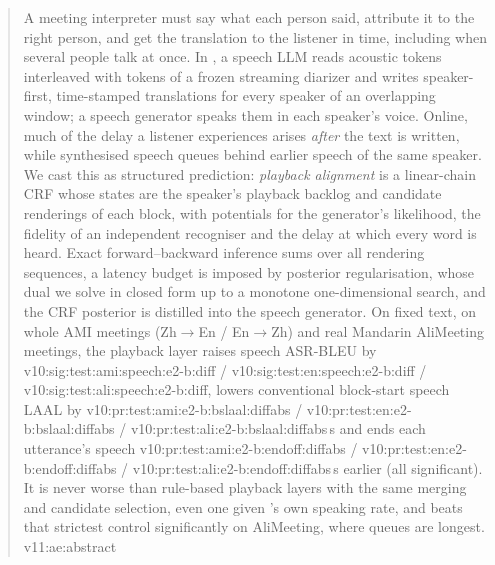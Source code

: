 \begin{abstract}
A meeting interpreter must say what each person said, attribute it to the right person, and get the translation to the
listener in time, including when several people talk at once. In \sys{}, a speech LLM reads acoustic tokens interleaved
with tokens of a frozen streaming diarizer and writes speaker-first, time-stamped translations for every speaker of an
overlapping window; a speech generator speaks them in each speaker's voice. Online, much of the delay a listener
experiences arises \emph{after} the text is written, while synthesised speech queues behind earlier speech of the same
speaker. We cast this as structured prediction: \emph{playback alignment} is a linear-chain CRF whose states are the
speaker's playback backlog and candidate renderings of each block, with potentials for the generator's likelihood, the
fidelity of an independent recogniser and the delay at which every word is heard. Exact forward--backward inference
sums over all rendering sequences, a latency budget is imposed by posterior regularisation, whose dual we solve in
closed form up to a monotone one-dimensional search, and the CRF posterior is distilled into the speech generator. On
fixed text, on whole AMI meetings (Zh$\rightarrow$En / En$\rightarrow$Zh) and real Mandarin AliMeeting meetings, the
playback layer raises speech ASR-BLEU by \num{v10:sig:test:ami:speech:e2-b:diff} /
\num{v10:sig:test:en:speech:e2-b:diff} / \num{v10:sig:test:ali:speech:e2-b:diff}, lowers conventional block-start
speech LAAL by \num{v10:pr:test:ami:e2-b:bslaal:diffabs} / \num{v10:pr:test:en:e2-b:bslaal:diffabs} /
\num{v10:pr:test:ali:e2-b:bslaal:diffabs}\,s and ends each utterance's speech
\num{v10:pr:test:ami:e2-b:endoff:diffabs} / \num{v10:pr:test:en:e2-b:endoff:diffabs} /
\num{v10:pr:test:ali:e2-b:endoff:diffabs}\,s earlier (all significant). It is never worse than rule-based playback
layers with the same merging and candidate selection, even one given \sys{}'s own speaking rate, and beats that
strictest control significantly on AliMeeting, where queues are longest.\ifAliEval{} \num{v11:ae:abstract}\fi
\end{abstract}
